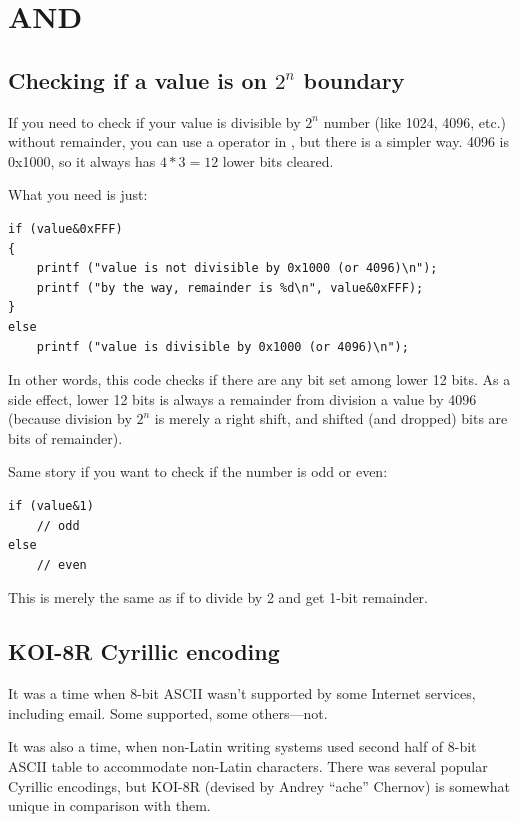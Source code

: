 \section{AND}

\subsection{Checking if a value is on $2^n$ boundary}

If you need to check if your value is divisible by $2^n$ number (like 1024, 4096, etc.) without remainder,
you can use a \TT{\%} operator in \CCpp, but there is a simpler way.
4096 is 0x1000, so it always has $4*3=12$ lower bits cleared.

What you need is just:

\begin{lstlisting}
if (value&0xFFF)
{
	printf ("value is not divisible by 0x1000 (or 4096)\n");
	printf ("by the way, remainder is %d\n", value&0xFFF);
}
else
	printf ("value is divisible by 0x1000 (or 4096)\n");
\end{lstlisting}

In other words, this code checks if there are any bit set among lower 12 bits.
As a side effect, lower 12 bits is always a remainder from division a value by 4096 (because division by $2^n$
is merely a right shift, and shifted (and dropped) bits are bits of remainder).

Same story if you want to check if the number is odd or even:

\begin{lstlisting}
if (value&1)
	// odd
else
	// even
\end{lstlisting}

This is merely the same as if to divide by 2 and get 1-bit remainder.

\subsection{KOI-8R Cyrillic encoding}

It was a time when 8-bit \ac{ASCII} wasn't supported by some Internet services, including email.
Some supported, some others---not.

It was also a time, when non-Latin writing systems used second half of 8-bit ASCII table to accommodate non-Latin characters.
There was several popular Cyrillic encodings, but KOI-8R (devised by Andrey ``ache'' Chernov)
is somewhat unique in comparison with them.

